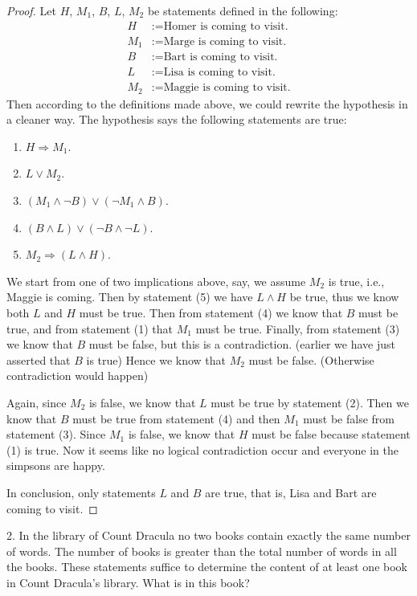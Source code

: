 \documentclass{article}
\theoremstyle{definition}
\theoremstyle{remark}
\begin{document}
\begin{proof}
    Let $H$, $M_1$, $B$, $L$, $M_2$ be statements defined in the following:
    \begin{align*}
        H &:= \text{Homer is coming to visit.}\\
        M_1 &:= \text{Marge is coming to visit.}\\
        B &:= \text{Bart is coming to visit.}\\
        L &:= \text{Lisa is coming to visit.}\\
        M_2 &:= \text{Maggie is coming to visit.}
    \end{align*}
    Then according to the definitions made above,
    we could rewrite the hypothesis in a cleaner way.
    The hypothesis says the following statements are true:
    \begin{enumerate}
        \item $H \Rightarrow M_1$.
        \item $L \lor M_2$.
        \item $(M_1 \land \neg B) \lor (\neg M_1 \land B)$.
        \item $(B \land L) \lor (\neg B \land \neg L)$.
        \item $M_2 \Rightarrow (L \land H)$.
    \end{enumerate}
    We start from one of two implications above, 
    say, we assume $M_2$ is true, i.e., Maggie is coming.
    Then by statement (5) we have $L \land H$ be true,
    thus we know both $L$ and $H$ must be true.
    Then from statement (4) we know that $B$ must be true,
    and from statement (1) that $M_1$ must be true.
    Finally, from statement (3) we know that $B$ must be false, but this is a contradiction. (earlier we have just asserted that $B$ is true)
    Hence we know that $M_2$ must be false. (Otherwise contradiction would happen)

    Again, since $M_2$ is false, we know that $L$ must be true by statement (2).
    Then we know that $B$ must be true from statement (4) and then $M_1$ must be false from statement (3).
    Since $M_1$ is false, we know that $H$ must be false because statement (1) is true.
    Now it seems like no logical contradiction occur and everyone in the simpsons are happy.

    In conclusion, only statements $L$ and $B$ are true, that is, Lisa and Bart are coming to visit.
\end{proof}

2. In the library of Count Dracula no two books contain exactly the same number of words.
The number of books is greater than the total number of words in all the books.
These statements suffice to determine the content of at least one book in Count Dracula's
library. What is in this book?
\end{document}
